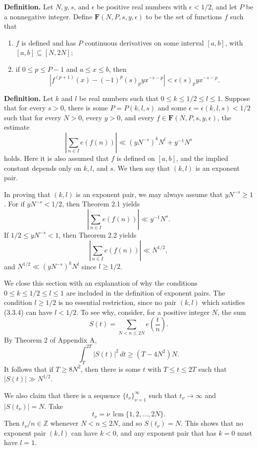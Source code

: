 \documentclass[10pt]{article}
\newcommand{\Fclass}{\mathbf{F}}
\newcommand{\lcmop}{\operatorname{lcm}}
\begin{document}
\medskip
\noindent\textbf{Definition.}
Let $N,y,s$, and $\epsilon$ be positive real numbers with $\epsilon<1/2$, and
let $P$ be a nonnegative integer. Define $\Fclass(N,P,s,y,\epsilon)$ to be the
set of functions $f$ such that
\begin{enumerate}
 \item $f$ is defined and has $P$ continuous derivatives on some interval
       $[a,b]$, with $[a,b]\subseteq[N,2N]$;
 \item if $0\leq p\leq P-1$ and $a\leq x\leq b$, then
 \begin{equation*}
  \left|f^{(p+1)}(x)-(-1)^p(s)_p yx^{-s-p}\right|
  <\epsilon(s)_p yx^{-s-p}. \tag{3.3.3}
 \end{equation*}
\end{enumerate}

\medskip
\noindent\textbf{Definition.}
Let $k$ and $l$ be real numbers such that
$0\leq k\leq1/2\leq l\leq1$. Suppose that for every $s>0$, there is some
$P=P(k,l,s)$ and some $\epsilon=\epsilon(k,l,s)<1/2$ such that for every
$N>0$, every $y>0$, and every
$f\in\Fclass(N,P,s,y,\epsilon)$, the estimate
\begin{equation*}
 \left|\sum_{n\in I}e(f(n))\right|
 \ll (yN^{-s})^kN^l+y^{-1}N^s \tag{3.3.4}
\end{equation*}
holds. Here it is also assumed that $f$ is defined on $[a,b]$, and the implied
constant depends only on $k,l$, and $s$. We then say that $(k,l)$ is an
exponent pair.

In proving that $(k,l)$ is an exponent pair, we may always assume that
$yN^{-s}\geq1$. For if $yN^{-s}<1/2$, then Theorem 2.1 yields
\[
 \left|\sum_{n\in I}e(f(n))\right|\ll y^{-1}N^s.
\]
If $1/2\leq yN^{-s}<1$, then Theorem 2.2 yields
\[
 \left|\sum_{n\in I}e(f(n))\right|\ll N^{1/2},
\]
and $N^{1/2}\ll(yN^{-s})^kN^l$ since $l\geq1/2$.

We close this section with an explanation of why the conditions
$0\leq k\leq1/2\leq l\leq1$ are included in the definition of exponent
pairs. The condition $l\geq1/2$ is no essential restriction, since no pair
$(k,l)$ which satisfies (3.3.4) can have $l<1/2$. To see why, consider, for a positive integer $N$, the sum
\[
 S(t)=\sum_{N<n\leq2N}e\left(\frac tn\right).
\]
By Theorem 2 of Appendix A,
\[
 \int_T^{2T}|S(t)|^2\,dt\geq(T-4N^2)N.
\]
It follows that if $T\geq8N^2$, then there is some $t$ with
$T\leq t\leq2T$ such that $|S(t)|\gg N^{1/2}$.

We also claim that there is a sequence $\{t_\nu\}_{\nu=1}^{\infty}$ such that
$t_\nu\to\infty$ and $|S(t_\nu)|=N$. Take
\[
 t_\nu=\nu\,\lcmop\{1,2,\ldots,2N\}.
\]
Then $t_\nu/n\in\mathbb Z$ whenever $N<n\leq2N$, and so $S(t_\nu)=N$.
This shows that no exponent pair $(k,l)$ can have $k<0$, and any exponent pair
that has $k=0$ must have $l=1$.
\end{document}
